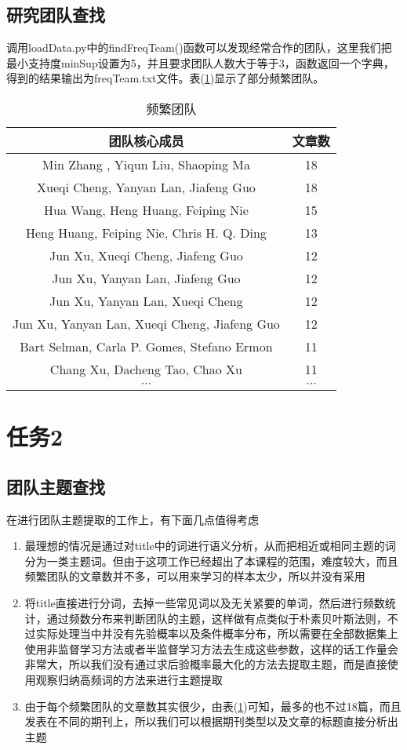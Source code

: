 \documentclass[a4paper,oneside,12pt]{article}
\begin{document}
\begin{spacing}{1.5}
\begin{table}[htbp]
\begin{tabular}{ccccccc}
\bottomrule
\end{tabular}
\end{table}

\subsection{研究团队查找}
调用loadData.py中的findFreqTeam()函数可以发现经常合作的团队，这里我们把最小支持度minSup设置为5，并且要求团队人数大于等于3，函数返回一个字典，得到的结果输出为freqTeam.txt文件。表(\ref{tab4})显示了部分频繁团队。

\begin{table}[htbp]
\caption{频繁团队\label{tab4}}
\center
\begin{tabular}{cc}
\toprule
团队核心成员 & 文章数 \\
\midrule
Min Zhang , Yiqun Liu, Shaoping Ma	&	18 \\
Xueqi Cheng, Yanyan Lan, Jiafeng Guo	&	18\\
Hua Wang, Heng Huang, Feiping Nie	&	15\\
Heng Huang, Feiping Nie, Chris H. Q. Ding		&13\\
Jun Xu, Xueqi Cheng, Jiafeng Guo	&	12\\
Jun Xu, Yanyan Lan, Jiafeng Guo	&	12\\
Jun Xu, Yanyan Lan, Xueqi Cheng	&	12\\
Jun Xu, Yanyan Lan, Xueqi Cheng, Jiafeng Guo	&	12\\
Bart Selman, Carla P. Gomes, Stefano Ermon	&	11\\
Chang Xu, Dacheng Tao, Chao Xu 	&	11\\
$\cdots$ & $\cdots $ \\
\bottomrule
\end{tabular}
\end{table}


\section{任务2}
\subsection{团队主题查找}
在进行团队主题提取的工作上，有下面几点值得考虑
\begin{enumerate}
\item 最理想的情况是通过对title中的词进行语义分析，从而把相近或相同主题的词分为一类主题词。但由于这项工作已经超出了本课程的范围，难度较大，而且频繁团队的文章数并不多，可以用来学习的样本太少，所以并没有采用
\item 将title直接进行分词，去掉一些常见词以及无关紧要的单词，然后进行频数统计，通过频数分布来判断团队的主题，这样做有点类似于朴素贝叶斯法则，不过实际处理当中并没有先验概率以及条件概率分布，所以需要在全部数据集上使用非监督学习方法或者半监督学习方法去生成这些参数，这样的话工作量会非常大，所以我们没有通过求后验概率最大化的方法去提取主题，而是直接使用观察归纳高频词的方法来进行主题提取
\item 由于每个频繁团队的文章数其实很少，由表(\ref{tab4})可知，最多的也不过18篇，而且发表在不同的期刊上，所以我们可以根据期刊类型以及文章的标题直接分析出主题


\end{enumerate}
\end{spacing}
\end{document}
